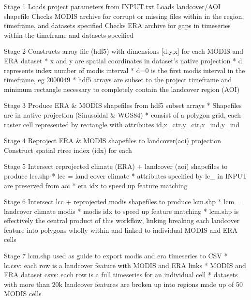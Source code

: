 \documentclass[twoside,a4paper]{refart}
\begin{document}
      Stage 1
        Loads project parameters from INPUT.txt
        Loads landcover/AOI shapefile
        Checks MODIS archive for corrupt or missing files
          within in the region, timeframe, and datasets specified
        Checks ERA archive for gaps in timeseries
          within the timeframe and datasets specified

      Stage 2
        Constructs array file (hdf5) with dimensions [d,y,x] for each
        MODIS and ERA dataset
        * x and y are spatial coordinates in dataset's native projection
        * d represents index number of modis interval
        * d=0 is the first modis interval in the timeframe, eg 2000049
        * hdf5 arrays are subset to the project timeframe and minimum
          rectangle necessary to completely contain the landcover region (AOI)

      Stage 3
        Produce ERA \& MODIS shapefiles from hdf5 subset arrays
        * Shapefiles are in native projection (Sinusoidal \& WGS84)
        * consist of a polygon grid, each raster cell represented by
          rectangle with attributes id,x\_ctr,y\_ctr,x\_ind,y\_ind

      Stage 4
        Reproject ERA \& MODIS shapefiles to landcover(aoi) projection
        Construct spatial rtree index (idx) for each

      Stage 5
        Intersect reprojected climate (ERA) + landcover (aoi) shapefiles
        to produce lcc.shp
          * lcc = land cover climate
          * attributes specified by lc\_ in INPUT are preserved from aoi
          * era idx to speed up feature matching

      Stage 6
        Intersect lcc + reprojected modis shapefiles to produce lcm.shp
        * lcm = landcover climate modis
        * modis idx to speed up feature matching
        * lcm.shp is effectively the central product of this workflow, linking
          breaking each landcover feature into polygons wholly within and
          linked to individual MODIS and ERA cells

      Stage 7
        lcm.shp used as guide to export modis and era timeseries to CSV
        * lc.csv: each row is a landcover feature with MODIS and ERA links
        * MODIS and ERA dataset csvs: each row is a full timeseries for an
          individual cell
        * datasets with more than 20k landcover features are broken up into
          regions made up of 50 MODIS cells


\clearpage
\end{document}
